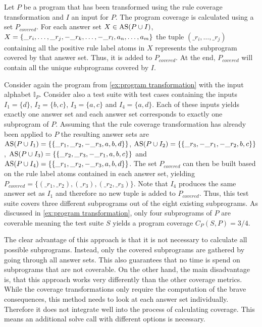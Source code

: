 \begin{definition}
\label{def:program coverage calculation}
    Let $P$ be a program that has been transformed using the rule coverage transformation and $I$ an input for $P$. The program coverage is calculated using a set $P_{covered}$. For each answer set \(X \in \operatorname{AS}(P \cup I)\), \(X = \{\_r_i, \ldots, \_r_j, -\_r_k, \ldots, -\_r_l, \linebreak a_n, \ldots, a_m\}\) the tuple \((\_r_i, \ldots, \_r_j)\) containing all the positive rule label atoms in $X$ represents the subprogram covered by that answer set. Thus, it is added to $P_{covered}$. At the end, $P_{covered}$ will contain all the unique subprograms covered by $I$.
\end{definition}

\begin{example}
\label{ex:program coverage calculation}
    Consider again the program from \cref{ex:program transformation} with the input alphabet $\mathbb{I}_P$. Consider also a test suite with test cases containing the inputs \(I_1 = \{d\}\), \(I_2 = \{b, c\}\), \(I_3 = \{a, c\}\) and \(I_4 = \{a, d\}\). Each of these inputs yields exactly one answer set and each answer set corresponds to exactly one subprogram of $P$. Assuming that the rule coverage transformation has already been applied to $P$ the resulting answer sets are \(\operatorname{AS}(P \cup I_1) = \{\{\_r_1, \_r_2, -\_r_3, a, b, d\}\}\), \(\operatorname{AS}(P \cup I_2) = \{\{\_r_3, -\_r_1, -\_r_2, b, c\}\}\), \(\operatorname{AS}(P \cup I_3) = \{\{\_r_2, \_r_3, -\_r_1, a, b, c\}\}\) and \(\operatorname{AS}(P \cup I_4) = \{\{\_r_1, \_r_2, -\_r_3, a, b, d\}\}\). The set $P_{covered}$ can then be built based on the rule label atoms contained in each answer set, yielding \(P_{covered} = \{(\_r_1, \_r_2), (\_r_3), (\_r_2, \_r_3)\}\). Note that $I_4$ produces the same answer set as $I_1$ and therefore no new tuple is added to $P_{covered}$. Thus, this test suite covers three different subprograms out of the eight existing subprograms. As discussed in \cref{ex:program transformation}, only four subprograms of $P$ are coverable meaning the test suite $S$ yields a program coverage \(C_P(S, P) = 3 / 4\).
\end{example}

The clear advantage of this approach is that it is not necessary to calculate all possible subprograms. Instead, only the covered subprograms are gathered by going through all answer sets. This also guarantees that no time is spend on subprograms that are not coverable. On the other hand, the main disadvantage is, that this approach works very differently than the other coverage metrics. While the coverage transformations only require the computation of the brave consequences, this method needs to look at each answer set individually. Therefore it does not integrate well into the process of calculating coverage. This means an additional solve call with different options is necessary. 

